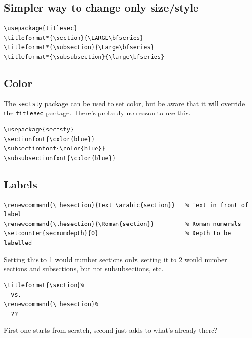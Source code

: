 \documentclass{article}
\begin{document}
\subsection{Simpler way to change only size/style}
\begin{lstlisting}
\usepackage{titlesec}
\titleformat*{\section}{\LARGE\bfseries}
\titleformat*{\subsection}{\Large\bfseries}
\titleformat*{\subsubsection}{\large\bfseries}
\end{lstlisting}

\subsection{Color}
The \verb|sectsty| package can be used to set color, but be aware that it will
override the \verb|titlesec| package. There's probably no reason to use this.
\begin{lstlisting}
\usepackage{sectsty}
\sectionfont{\color{blue}}
\subsectionfont{\color{blue}}
\subsubsectionfont{\color{blue}}
\end{lstlisting}

\subsection{Labels}
\begin{lstlisting}
\renewcommand{\thesection}{Text \arabic{section}}   % Text in front of label
\renewcommand{\thesection}{\Roman{section}}         % Roman numerals
\setcounter{secnumdepth}{0}                         % Depth to be labelled
\end{lstlisting}
Setting this to 1 would number sections only, setting it to 2 would
number sections and subsections, but not subsubsections, etc.



\begin{lstlisting}
\titleformat{\section}%
  vs.
\renewcommand{\thesection}%
  ??
\end{lstlisting}
First one starts from scratch, second just adds to what's already there?
\end{document}
